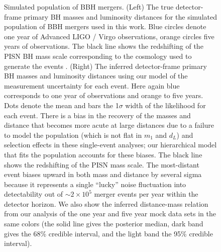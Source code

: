 \documentclass[modern]{aastex62}
\begin{document}
\begin{figure}
%
  \caption{\label{fig:m1-dL} Simulated population of \ac{BBH} mergers.  (Left)
  The true detector-frame primary \ac{BH} masses and luminosity distances for
  the simulated population of \ac{BBH} mergers used in this work.  Blue circles
  denote one year of Advanced LIGO / Virgo observations, orange circles five
  years of observations. The black line shows the redshifting of the PISN
  \ac{BH} mass scale corresponding to the cosmology used to generate the events
  \citep[TT, TE, EE + lowP + lensing + ext]{Planck2016}.  (Right) The inferred
  detector-frame primary \ac{BH} masses and luminosity distances using our model
  of the measurement uncertainty for each event.  Here again blue corresponds to
  one year of observations and orange to five years.  Dots denote the mean and
  bars the 1$\sigma$ width of the likelihood for each event.  There is a bias in
  the recovery of the masses and distance that becomes more acute at large
  distances due to a failure to model the population (which is not flat in $m_1$
  and $d_L$) and selection effects in these single-event analyses; our
  hierarchical model that fits the population accounts for these biases.  The
  black line shows the redshifting of the \ac{PISN} mass scale. The most-distant
  event biases upward in both mass and distance by several sigma because it
  represents a single ``lucky'' noise fluctuation into detectability out of
  $\sim 2 \times 10^5$ merger events per year within the detector horizon.  We
  also show the inferred distance-mass relation from our analysis of the one
  year and five year mock data sets in the same colors (the solid line gives the
  posterior median, dark band gives the 68\% credible interval, and the light
  band the 95\% credible interval).}
%
\end{figure}
\end{document}
